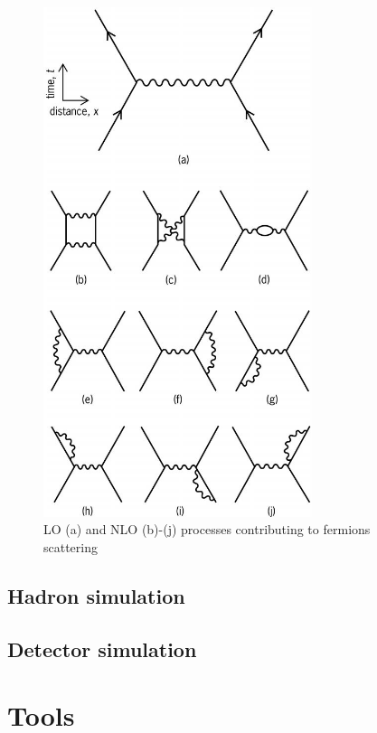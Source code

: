 \begin{figure}[!Hhtbp]
  \begin{center}
    \includegraphics[width=0.7\textwidth]{figs/Feynman_diagrams.jpg}
    \caption{LO (a) and NLO (b)-(j) processes contributing to fermions scattering}
    \label{fig:LOpNLO}
  \end{center}
\end{figure}

\subsection{Hadron simulation}
\label{sec:hadron}

\subsection{Detector simulation}
\label{sec:detector}


\section{Tools}
\label{sec:tools}

